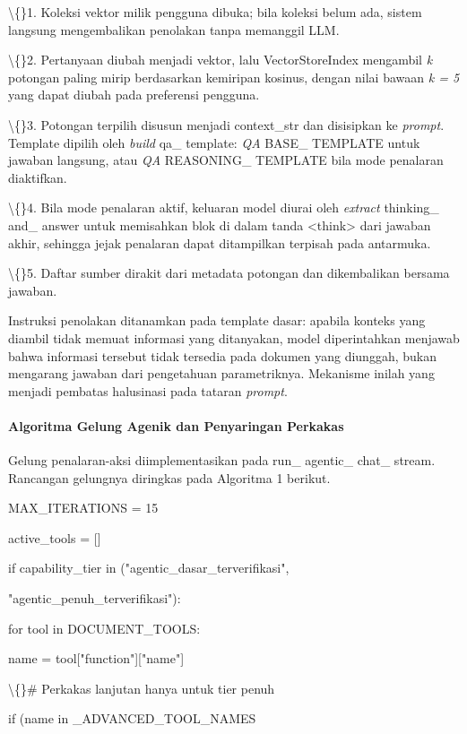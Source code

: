 \documentclass[12pt,a4paper]{article}
\begin{document}
\textbackslash\{\}1. Koleksi vektor milik pengguna dibuka; bila koleksi belum ada, sistem langsung mengembalikan penolakan tanpa memanggil LLM.

\textbackslash\{\}2. Pertanyaan diubah menjadi vektor, lalu VectorStoreIndex mengambil \textit{k} potongan paling mirip berdasarkan kemiripan kosinus, dengan nilai bawaan \textit{k = 5} yang dapat diubah pada preferensi pengguna.

\textbackslash\{\}3. Potongan terpilih disusun menjadi context\_str dan disisipkan ke \textit{prompt}. Template dipilih oleh \textit{build} qa\_ template: \textit{QA} BASE\_ TEMPLATE untuk jawaban langsung, atau \textit{QA} REASONING\_ TEMPLATE bila mode penalaran diaktifkan.

\textbackslash\{\}4. Bila mode penalaran aktif, keluaran model diurai oleh \textit{extract} thinking\_ and\_ answer untuk memisahkan blok di dalam tanda \textless{}think\textgreater{} dari jawaban akhir, sehingga jejak penalaran dapat ditampilkan terpisah pada antarmuka.

\textbackslash\{\}5. Daftar sumber dirakit dari metadata potongan dan dikembalikan bersama jawaban.

Instruksi penolakan ditanamkan pada template dasar: apabila konteks yang diambil tidak memuat informasi yang ditanyakan, model diperintahkan menjawab bahwa informasi tersebut tidak tersedia pada dokumen yang diunggah, bukan mengarang jawaban dari pengetahuan parametriknya. Mekanisme inilah yang menjadi pembatas halusinasi pada tataran \textit{prompt}.

\paragraph*{Algoritma Gelung Agenik dan Penyaringan Perkakas}
Gelung penalaran-aksi diimplementasikan pada run\_ agentic\_ chat\_ stream. Rancangan gelungnya diringkas pada Algoritma 1 berikut.

MAX\_ITERATIONS = 15

active\_tools = {[}{]}

if capability\_tier in ("agentic\_dasar\_terverifikasi",

"agentic\_penuh\_terverifikasi"):

for tool in DOCUMENT\_TOOLS:

name = tool{[}"function"{]}{[}"name"{]}

\textbackslash\{\}\# Perkakas lanjutan hanya untuk tier penuh

if (name in \_ADVANCED\_TOOL\_NAMES
\end{document}
